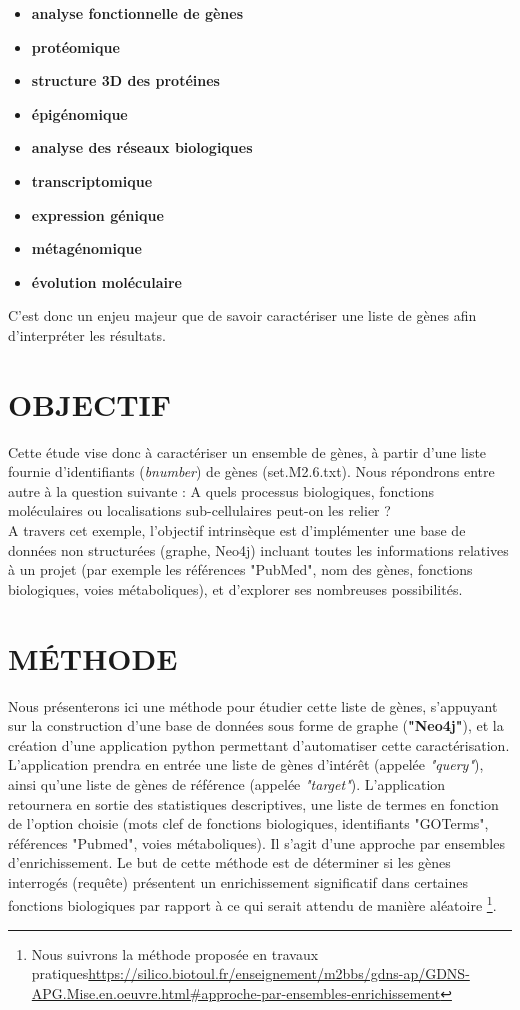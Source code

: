 \documentclass[a4paper,11pt,openright]{report}
\begin{document}
\begin{itemize}
	\item \textbf{analyse fonctionnelle de gènes} 
	\item \textbf{protéomique} 
	\item \textbf{structure 3D des protéines} 
	\item \textbf{épigénomique} 
	\item \textbf{analyse des réseaux biologiques} 
	\item \textbf{transcriptomique} 
	\item \textbf{expression génique} 
	\item \textbf{métagénomique} 
	\item \textbf{évolution moléculaire} 
\end{itemize}

C'est donc un enjeu majeur que de savoir caractériser une liste de gènes afin d’interpréter les résultats.

	\section{OBJECTIF}
Cette étude vise donc à caractériser un ensemble de gènes, à partir d'une liste fournie d'identifiants  (\textit{bnumber}) de gènes (set.M2.6.txt). Nous répondrons entre autre à la question suivante :
A quels processus biologiques, fonctions moléculaires ou localisations sub-cellulaires peut-on les relier ? \\
 A travers cet exemple, l'objectif intrinsèque est d'implémenter une base de données non structurées (graphe, Neo4j) incluant toutes les informations relatives à un projet (par exemple les références "PubMed", nom des gènes, fonctions biologiques, voies métaboliques), et d'explorer ses nombreuses possibilités.  

	\section{MÉTHODE}
Nous présenterons ici une méthode pour étudier cette liste de gènes, s'appuyant sur la construction d'une base de données sous forme de graphe (\textbf{"Neo4j"}), et la création d'une application python permettant d'automatiser cette caractérisation. L'application prendra en entrée une liste de gènes d’intérêt (appelée \textit{"query"}), ainsi qu'une liste de gènes de référence (appelée \textit{"target"}). L'application retournera en sortie des statistiques descriptives, une liste de termes en fonction de l'option choisie (mots clef de fonctions biologiques, identifiants "GOTerms", références "Pubmed", voies métaboliques). Il s'agit d'une approche par ensembles d'enrichissement. Le but de cette méthode est de déterminer si les gènes interrogés (requête) présentent un  enrichissement significatif dans certaines fonctions biologiques par rapport à ce qui serait attendu de manière aléatoire
\footnote{Nous suivrons la méthode proposée en travaux pratiques{\url {https://silico.biotoul.fr/enseignement/m2bbs/gdns-ap/GDNS-APG.Mise.en.oeuvre.html\#approche-par-ensembles-enrichissement}}}. 
\end{document}
